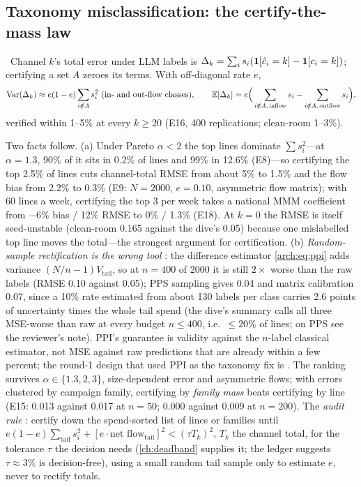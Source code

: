 \subsection{Taxonomy misclassification: the certify-the-mass law}

\begin{law}
\label{arch:law:certify}
\tagEstablished\ Channel $k$'s total error under LLM labels is $\Delta_k = \sum_i s_i(\mathbf{1}[\hat c_i = k] - \mathbf{1}[c_i = k])$; certifying a set $A$ zeroes its terms. With off-diagonal rate $e$,
\begin{equation}
\operatorname{Var}(\Delta_k) \approx e(1-e)\sum_{i \notin A} s_i^2 \ \text{(in- and out-flow classes)},\qquad
\mathbb{E}[\Delta_k] = e\Big(\sum_{i \notin A,\,\mathrm{inflow}} s_i - \sum_{i \notin A,\,\mathrm{outflow}} s_i\Big),
\label{arch:eq:mse}
\end{equation}
verified within 1--5\% at every $k \ge 20$ (E16, 400 replications; clean-room 1--3\%).
\end{law}

Two facts follow. (a) Under Pareto $\alpha < 2$ the top lines dominate $\sum s_i^2$---at $\alpha = 1.3$, 90\% of it sits in 0.2\% of lines and 99\% in 12.6\% (E8)---so certifying the top 2.5\% of lines cuts channel-total RMSE from about 5\% to 1.5\% and the flow bias from 2.2\% to 0.3\% (E9: $N = 2000$, $e = 0.10$, asymmetric flow matrix); with 60 lines a week, certifying the top 3 per week takes a national MMM coefficient from $-6\%$ bias / 12\% RMSE to 0\% / 1.3\% (E18). At $k = 0$ the RMSE is itself seed-unstable (clean-room 0.165 against the dive's 0.05) because one mislabelled top line moves the total---the strongest argument for certification. (b) \emph{Random-sample rectification is the wrong tool} \tagNumerical: the difference estimator \cref{arch:eq:ppi} adds variance $(N/n-1)V_{\mathrm{tail}}$, so at $n = 400$ of 2000 it is still $2\times$ worse than the raw labels (RMSE 0.10 against 0.05); PPS sampling gives 0.04 and matrix calibration 0.07, since a 10\% rate estimated from about 130 labels per class carries 2.6 points of uncertainty times the whole tail spend (the dive's summary calls all three MSE-worse than raw at every budget $n \le 400$, i.e.\ $\le 20\%$ of lines; on PPS see the reviewer's note). PPI's guarantee is validity against the $n$-label classical estimator, not MSE against raw predictions that are already within a few percent; the round-1 design that used PPI as the taxonomy fix is \tagRefuted. The ranking survives $\alpha \in \{1.3,2,3\}$, size-dependent error and asymmetric flows; with errors clustered by campaign family, certifying by \emph{family mass} beats certifying by line (E15: 0.013 against 0.017 at $n = 50$; 0.000 against 0.009 at $n = 200$). The \emph{audit rule} \tagConjecture: certify down the spend-sorted list of lines or families until $e(1-e)\sum_{\mathrm{tail}}s_i^2 + [e\cdot\text{net flow}_{\mathrm{tail}}]^2 < (\tau T_k)^2$, $T_k$ the channel total, for the tolerance $\tau$ the decision needs (\cref{ch:deadband} supplies it; the ledger suggests $\tau \approx 3\%$ is decision-free), using a small random tail sample only to estimate $e$, never to rectify totals.

